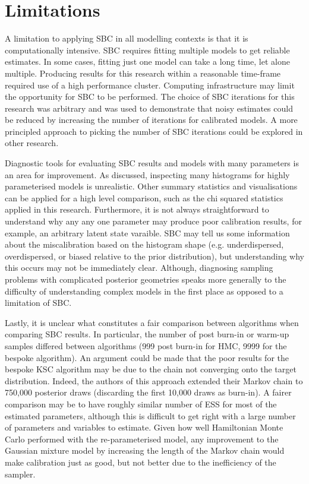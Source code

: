 \documentclass[12pt, a4paper]{article}
\begin{document}

\section{Limitations}
A limitation to applying SBC in all modelling contexts is that it is computationally intensive. SBC requires fitting multiple models to get reliable estimates. In some cases, fitting just one model can take a long time, let alone multiple. Producing results for this research within a reasonable time-frame required use of a high performance cluster. Computing infrastructure may limit the opportunity for SBC to be performed. The choice of SBC iterations for this research was arbitrary and was used to demonstrate that noisy estimates could be reduced by increasing the number of iterations for calibrated models. A more principled approach to picking the number of SBC iterations could be explored in other research.

Diagnostic tools for evaluating SBC results and models with many parameters is an area for improvement. As discussed, inspecting many histograms for highly parameterised models is unrealistic. Other summary statistics and visualisations can be applied for a high level comparison, such as the chi squared statistics applied in this research. Furthermore, it is not always straightforward to understand why any any one parameter may produce poor calibration results, for example, an arbitrary latent state varaible. SBC may tell us some information about the miscalibration based on the histogram shape (e.g. underdispersed, overdispersed, or biased relative to the prior distribution), but understanding why this occurs may not be immediately clear. Although, diagnosing sampling problems with complicated posterior geometries speaks more generally to the difficulty of understanding complex models in the first place as opposed to a limitation of SBC.

Lastly, it is unclear what constitutes a fair comparison between algorithms when comparing SBC results. In particular, the number of post burn-in or warm-up samples differed between algorithms (999 post burn-in for HMC, 9999 for the bespoke algorithm). An argument could be made that the poor results for the bespoke KSC algorithm may be due to the chain not converging onto the target distribution. Indeed, the authors of this approach extended their Markov chain to 750,000 posterior draws (discarding the first 10,000 draws as burn-in). A fairer comparison may be to have roughly similar number of ESS for most of the estimated parameters, although this is difficult to get right with a large number of parameters and variables to estimate. Given how well Hamiltonian Monte Carlo performed with the re-parameterised model, any improvement to the Gaussian mixture model by increasing the length of the Markov chain would make calibration just as good, but not better due to the inefficiency of the sampler. 
\end{document}
